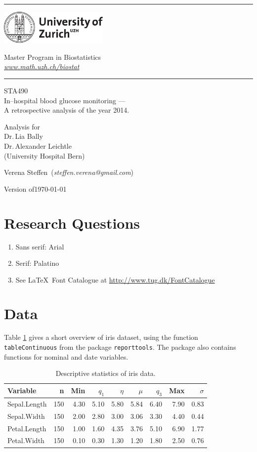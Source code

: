 \documentclass[11pt,a4paper,twoside]{article}\usepackage[]{graphicx}\usepackage[]{color}
\makeatletter
\newcommand{\name}{Verena Steffen}
\newcommand{\mail}{steffen.verena@gmail.com}
\newcommand{\versiondate}{\today}
\newcommand{\client}{\\
Dr.\,Lia Bally\\
Dr.\,Alexander Leichtle\\
(University Hospital Bern)}
\newcommand{\subtitle}{STA490\\
In--hospital blood glucose monitoring ---\\
A retrospective analysis of the year 2014.}
\newcommand{\web}{www.math.uzh.ch/biostat}
\newcommand{\grp}{Master Program in Biostatistics}
\newcommand{\img}{\includegraphics[height=17mm, width = 53mm]{uzh_logo_e_pos}}
\newcommand{\of}{of\xspace}
\newcommand{\HRule}{\rule{\linewidth}{0.5mm}}
\newcommand{\mytitle}[3]{
\begin{center}
\vspace*{-2.1cm}

\HRule

\vspace*{0.4cm}

\begin{minipage}{0.4\textwidth}
\thispagestyle{empty}
\begin{flushleft}
\hspace*{1cm}\img
\end{flushleft}
\end{minipage}
\begin{minipage}{0.59\textwidth}
\begin{flushleft} \large
    \hspace*{3.8cm} \textsf{\grp} \\
    \hspace*{3.8cm} \href{http://\web}{\textsf{\emph{\web}}}
\end{flushleft}
\end{minipage}

\vspace*{0.4cm} \HRule

\bigskip

\textsf{\LARGE #2} \vspace*{0.5cm}

\large{#1}

\medskip

\large{\name \ (\textit{\mail})}

\medskip

Version \of \versiondate

\end{center}

\medskip
}
\newcommand{\pkg}[1]{\texttt{#1}}
\makeatother
\begin{document}
\pagestyle{standard}
\mytitle{Analysis for \client}{\subtitle}
\tableofcontents

\bigskip




\section{Research Questions} \label{sec:questions}
\begin{enumerate}
    \item \textsf{Sans serif}: Arial
    \item Serif: Palatino
    \item See \LaTeX\ Font Catalogue at \url{http://www.tug.dk/FontCatalogue}
\end{enumerate}

\section{Data} \label{sec:data}
Table \ref{tab:iris} gives a short overview of iris dataset, using the
function \texttt{tableContinuous} from the package
\pkg{reporttools}. The package also contains functions for nominal and
date variables.

\begin{table}[ht]
\centering
\begingroup\footnotesize
\begin{tabular}{lrrrrrrrr}
 {\bf Variable} & n & Min & $q_1$ & $\eta$ & $\mu$ & $q_3$ & Max & $\sigma$ \\ 
  \hline
Sepal.Length & 150 & 4.30 & 5.10 & 5.80 & 5.84 & 6.40 & 7.90 & 0.83 \\ 
  Sepal.Width & 150 & 2.00 & 2.80 & 3.00 & 3.06 & 3.30 & 4.40 & 0.44 \\ 
  Petal.Length & 150 & 1.00 & 1.60 & 4.35 & 3.76 & 5.10 & 6.90 & 1.77 \\ 
  Petal.Width & 150 & 0.10 & 0.30 & 1.30 & 1.20 & 1.80 & 2.50 & 0.76 \\ 
  \end{tabular}
\endgroup
\caption{Descriptive statistics of iris data.} 
\label{tab:iris}
\end{table}
\end{document}
